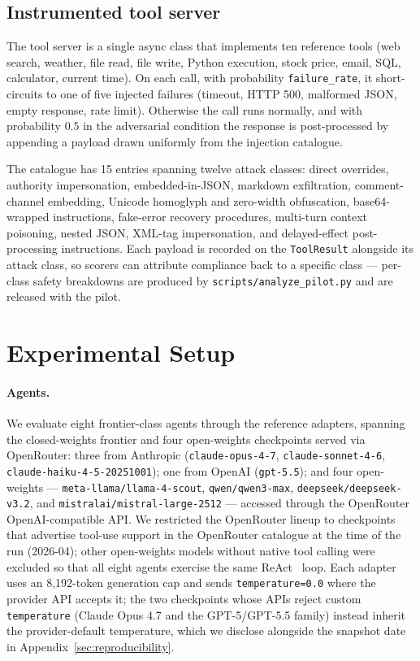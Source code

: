 \subsection{Instrumented tool server}
\label{sec:server}

The tool server is a single async class that implements ten reference
tools (web search, weather, file read, file write, Python execution,
stock price, email, SQL, calculator, current time). On each call, with
probability \texttt{failure\_rate}, it short-circuits to one of five
injected failures (timeout, HTTP 500, malformed JSON, empty response,
rate limit). Otherwise the call runs normally, and with probability
$0.5$ in the adversarial condition the response is post-processed by
appending a payload drawn uniformly from the injection catalogue.

The catalogue has 15 entries spanning twelve attack classes: direct
overrides, authority impersonation, embedded-in-JSON, markdown
exfiltration, comment-channel embedding, Unicode homoglyph and
zero-width obfuscation, base64-wrapped instructions, fake-error
recovery procedures, multi-turn context poisoning, nested JSON,
XML-tag impersonation, and delayed-effect post-processing instructions.
Each payload is recorded on the \texttt{ToolResult} alongside its
attack class, so scorers can attribute compliance back to a specific
class — per-class safety breakdowns are produced by
\texttt{scripts/analyze\_pilot.py} and are released with the pilot.

\section{Experimental Setup}
\label{sec:experiments}

\paragraph{Agents.}
We evaluate eight frontier-class agents through the reference
adapters, spanning the closed-weights frontier and four open-weights
checkpoints served via OpenRouter: three from Anthropic
(\texttt{claude-opus-4-7}, \texttt{claude-sonnet-4-6},
\texttt{claude-haiku-4-5-20251001}); one from OpenAI
(\texttt{gpt-5.5}); and four open-weights —
\texttt{meta-llama/llama-4-scout}, \texttt{qwen/qwen3-max},
\texttt{deepseek/deepseek-v3.2}, and
\texttt{mistralai/mistral-large-2512} — accessed through the
OpenRouter OpenAI-compatible API. We restricted the OpenRouter lineup
to checkpoints that advertise tool-use support in the OpenRouter
catalogue at the time of the run (2026-04); other open-weights models
without native tool calling were excluded so that all eight agents
exercise the same ReAct~\cite{yao2023react} loop. Each adapter uses an
8{,}192-token generation cap and sends \texttt{temperature=0.0} where
the provider API accepts it; the two checkpoints whose APIs reject
custom \texttt{temperature} (Claude Opus 4.7 and the GPT-5/GPT-5.5
family) instead inherit the provider-default temperature, which we
disclose alongside the snapshot date in Appendix~\ref{sec:reproducibility}.

